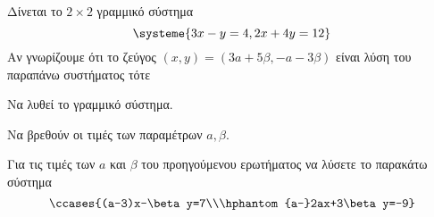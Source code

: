 Δίνεται το $ 2\times2 $ γραμμικό σύστημα
\[ \systeme{3x-y=4,2x+4y=12} \]
Αν γνωρίζουμε ότι το ζεύγος $ (x,y)=(3a+5\beta,-a-3\beta) $ είναι λύση του παραπάνω συστήματος τότε 
\begin{rlist}
\item Να λυθεί το γραμμικό σύστημα.
\item Να βρεθούν οι τιμές των παραμέτρων $ a,\beta $.
\item Για τις τιμές των $ a $ και $ \beta $ του προηγούμενου ερωτήματος να λύσετε το παρακάτω σύστημα
\[ \ccases{(a-3)x-\beta y=7\\\hphantom{a-}2ax+3\beta y=-9} \]
\end{rlist}